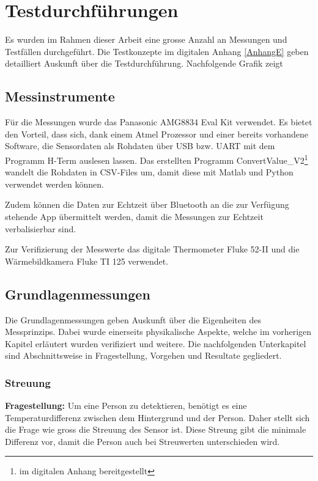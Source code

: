 \chapter{Testdurchführungen}
\label{chap:Testphasen}

Es wurden im Rahmen dieser Arbeit eine grosse Anzahl an Messungen und Testfällen durchgeführt. 
Die Testkonzepte im digitalen Anhang \ref{AnhangE} geben detailliert Auskunft über die Testdurchführung. 
Nachfolgende Grafik zeigt 

\section{Messinstrumente}

Für die Messungen wurde das Panasonic AMG8834 Eval Kit verwendet. Es bietet den Vorteil, dass sich, dank einem Atmel Prozessor und einer bereits vorhandene Software, die Sensordaten als Rohdaten über USB bzw. UART mit dem Programm H-Term auslesen lassen. 
Das erstellten Programm ConvertValue\_V2\footnote[12]{im digitalen Anhang bereitgestellt} wandelt die Rohdaten in \ac{CSV}-Files um, damit diese mit Matlab und Python verwendet werden können.

Zudem können die Daten zur Echtzeit über Bluetooth an die zur Verfügung stehende App übermittelt werden, damit die Messungen zur Echtzeit verbalisierbar sind.

Zur Verifizierung der Messwerte das digitale Thermometer Fluke 52-II und die Wärmebildkamera Fluke TI 125 verwendet.

\section{Grundlagenmessungen}

Die Grundlagenmessungen geben Auskunft über die Eigenheiten des Messprinzips. Dabei wurde einerseits physikalische Aspekte, welche im vorherigen Kapitel erläutert wurden verifiziert und weitere.
Die nachfolgenden Unterkapitel sind Abschnittsweise in Fragestellung, Vorgehen und Resultate gegliedert.


\subsection{Streuung}

\textbf{Fragestellung:} Um eine Person zu detektieren, benötigt es eine Temperaturdifferenz zwischen dem Hintergrund und der Person. Daher stellt sich die Frage wie gross die Streuung des Sensor ist. Diese Streung gibt die minimale Differenz vor, damit die Person auch bei Streuwerten unterschieden wird.


